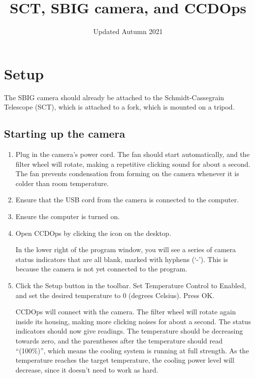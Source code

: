 \documentclass{article}
\title{SCT, SBIG camera, and CCDOps}
\date{Updated Autumn 2021}
\begin{document}
\maketitle
	
\section{Setup}

The SBIG camera should already be attached to the Schmidt-Cassegrain Telescope (SCT), which is attached to a fork, which is mounted on a tripod.

\subsection{Starting up the camera}

\begin{enumerate}
	\item Plug in the camera's power cord. The fan should start automatically, and the filter wheel will rotate, making a repetitive clicking sound for about a second. The fan prevents condensation from forming on the camera whenever it is colder than room temperature.
	
	\item Ensure that the USB cord from the camera is connected to the computer.
	
	\item Ensure the computer is turned on.
	
	\item Open CCDOps by clicking the icon on the desktop.
	
	In the lower right of the program window, you will see a series of camera status indicators that are all blank, marked with hyphens (`-'). This is because the camera is not yet connected to the program.
	
	\item Click the Setup button in the toolbar. Set Temperature Control to Enabled, and set the desired temperature to 0 (degrees Celsius). Press OK.
	
	CCDOps will connect with the camera. The filter wheel will rotate again inside its housing, making more clicking noises for about a second. The status indicators should now give readings. The temperature should be decreasing towards zero, and the parentheses after the temperature should read ``(100\%)'', which means the cooling system is running at full strength. As the temperature reaches the target temperature, the cooling power level will decrease, since it doesn't need to work as hard.
\end{enumerate}
\end{document}
